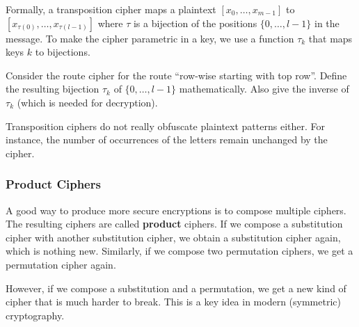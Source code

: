 Formally, a transposition cipher maps a plaintext $[x_0,\ldots,x_{m-1}]$ to $[x_{\tau(0)},\ldots,x_{\tau(l-1)}]$ where $\tau$ is a bijection of the positions $\{0,\ldots,l-1\}$ in the message.
To make the cipher parametric in a key, we use a function $\tau_k$ that maps keys $k$ to bijections.

\begin{exercise}\label{exc:sd:route}
Consider the route cipher for the route ``row-wise starting with top row''.
Define the resulting bijection $\tau_k$ of $\{0,\ldots,l-1\}$ mathematically.
Also give the inverse of $\tau_k$ (which is needed for decryption).
\end{exercise}

Transposition ciphers do not really obfuscate plaintext patterns either.
For instance, the number of occurrences of the letters remain unchanged by the cipher.

\subsubsection{Product Ciphers}
 
A good way to produce more secure encryptions is to compose multiple ciphers.
The resulting ciphers are called \textbf{product} ciphers.
If we compose a substitution cipher with another substitution cipher, we obtain a substitution cipher again, which is nothing new.
Similarly, if we compose two permutation ciphers, we get a permutation cipher again.

However, if we compose a substitution and a permutation, we get a new kind of cipher that is much harder to break.
This is a key idea in modern (symmetric) cryptography. 
